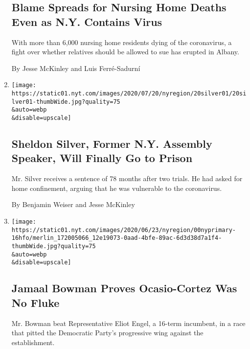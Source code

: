 \begin{enumerate}
  \hypertarget{blame-spreads-for-nursing-home-deaths-even-as-ny-contains-virus}{%
  \subsection{Blame Spreads for Nursing Home Deaths Even as N.Y.
  Contains
  Virus}\label{blame-spreads-for-nursing-home-deaths-even-as-ny-contains-virus}}

  With more than 6,000 nursing home residents dying of the coronavirus,
  a fight over whether relatives should be allowed to sue has erupted in
  Albany.

  By Jesse McKinley and Luis Ferré-Sadurní
\item
  \href{/2020/07/20/nyregion/sheldon-silver-sentencing-prison.html}{}

  \texttt{[image: https://static01.nyt.com/images/2020/07/20/nyregion/20silver01/20silver01-thumbWide.jpg?quality=75\\\&auto=webp\\\&disable=upscale]}

  \hypertarget{sheldon-silver-former-ny-assembly-speaker-will-finally-go-to-prison}{%
  \subsection{Sheldon Silver, Former N.Y. Assembly Speaker, Will Finally
  Go to
  Prison}\label{sheldon-silver-former-ny-assembly-speaker-will-finally-go-to-prison}}

  Mr. Silver receives a sentence of 78 months after two trials. He had
  asked for home confinement, arguing that he was vulnerable to the
  coronavirus.

  By Benjamin Weiser and Jesse McKinley
\item
  \href{/2020/07/17/nyregion/jamaal-bowman-eliot-engel.html}{}

  \texttt{[image: https://static01.nyt.com/images/2020/06/23/nyregion/00nyprimary-16hfo/merlin\_172005066\_12e19073-0aad-4bfe-89ac-6d3d38d7a1f4-thumbWide.jpg?quality=75\\\&auto=webp\\\&disable=upscale]}

  \hypertarget{jamaal-bowman-proves-ocasio-cortez-was-no-fluke}{%
  \subsection{Jamaal Bowman Proves Ocasio-Cortez Was No
  Fluke}\label{jamaal-bowman-proves-ocasio-cortez-was-no-fluke}}

  Mr. Bowman beat Representative Eliot Engel, a 16-term incumbent, in a
  race that pitted the Democratic Party's progressive wing against the
  establishment.


\end{enumerate}
